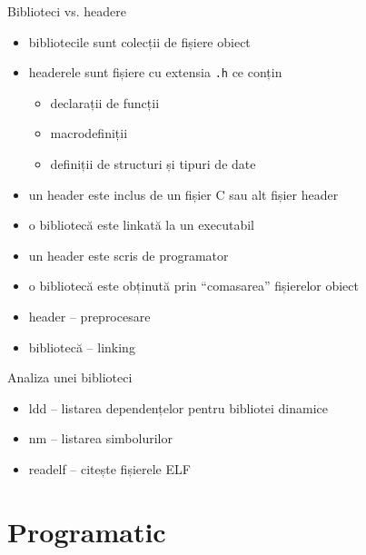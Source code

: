 \documentclass{simple}
\begin{document}
\begin{frame}{Biblioteci vs. headere}
  \begin{itemize}
    \item bibliotecile sunt colecții de fișiere obiect
    \item headerele sunt fișiere cu extensia \texttt{.h} ce conțin
      \begin{itemize}
        \item declarații de funcții
        \item macrodefiniții
        \item definiții de structuri și tipuri de date
      \end{itemize}
    \item un header este inclus de un fișier C sau alt fișier header
    \item o bibliotecă este linkată la un executabil
    \item un header este scris de programator
    \item o bibliotecă este obținută prin ``comasarea'' fișierelor obiect
    \item header -- preprocesare
    \item bibliotecă -- linking
  \end{itemize}
\end{frame}

\begin{frame}{Analiza unei biblioteci}
  \begin{itemize}
    \item ldd -- listarea dependențelor pentru bibliotei dinamice
    \item nm -- listarea simbolurilor
    \item readelf -- citește fișierele ELF
  \end{itemize}
\end{frame}

\section{Programatic}
\end{document}
